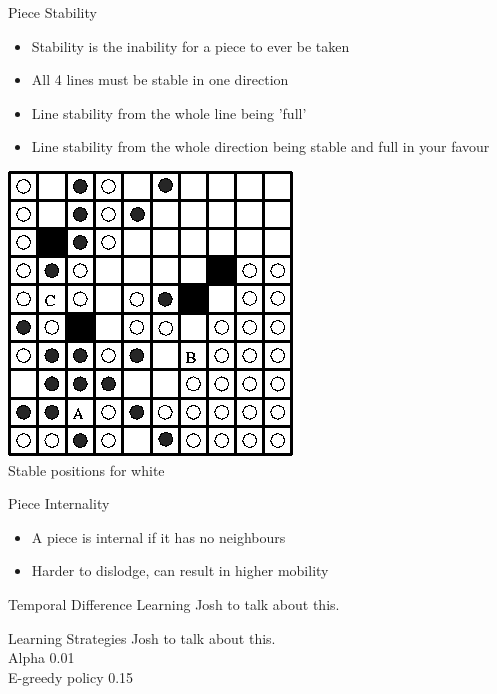 \documentclass{beamer}
\begin{document}
\begin{frame}{Piece Stability}
    \begin{itemize}
  \item
  Stability is the inability for a piece to ever be taken
  \item
   All 4 lines must be stable in one direction
  \item
   Line stability from the whole line being 'full'
  \item
   Line stability from the whole direction being stable and full in your favour
  \end{itemize}
\begin{center}
\includegraphics[scale=0.50]{stability.PNG}\\
Stable positions for white
\end{center}
\end{frame}

\begin{frame}{Piece Internality}
    \begin{itemize}
  \item
  A piece is internal if it has no neighbours
  \item
   Harder to dislodge, can result in higher mobility
  \end{itemize}
\end{frame}

\begin{frame}{Temporal Difference Learning}
Josh to talk about this.
\end{frame}

\begin{frame}{Learning Strategies}
Josh to talk about this.\\
Alpha 0.01\\
E-greedy policy 0.15\\
\end{frame}
\end{document}
